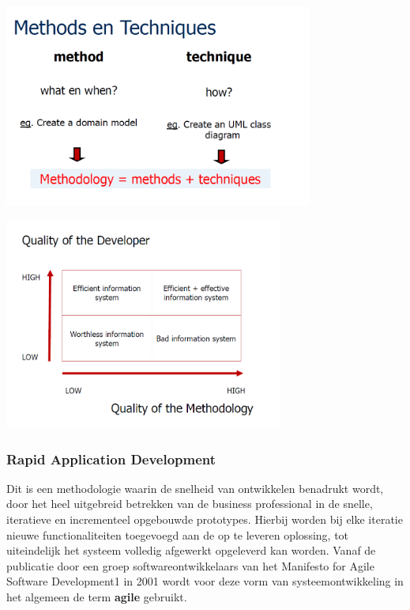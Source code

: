 \begin{center}
\includegraphics[width=4in]{img/methodstechniques}%
\end{center}




\begin{center}
\includegraphics[width=3.6in]{img/quality}%
\end{center}
\newpage
\subsubsection{Rapid Application Development}

Dit is een methodologie waarin de snelheid van ontwikkelen benadrukt wordt, door het heel uitgebreid betrekken van de business professional in de snelle, iteratieve en incrementeel opgebouwde prototypes. Hierbij worden bij elke iteratie nieuwe functionaliteiten toegevoegd aan de op te leveren oplossing, tot uiteindelijk het systeem volledig afgewerkt opgeleverd kan worden.
Vanaf de publicatie door een groep softwareontwikkelaars van het Manifesto for Agile Software Development1 in 2001 wordt voor deze vorm van systeemontwikkeling in het algemeen de term \textbf{agile} gebruikt.

